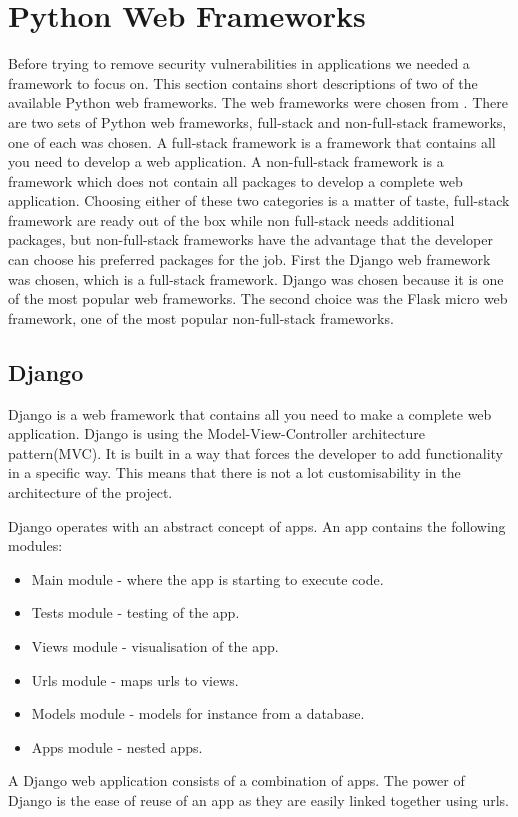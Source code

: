\section{Python Web Frameworks}\label{preliminaries:web_frameworks}
Before trying to remove security vulnerabilities in applications we needed a framework to focus on.
This section contains short descriptions of two of the available Python web frameworks.
The web frameworks were chosen from \citet{python_web_frameworks_list}.
There are two sets of Python web frameworks, full-stack and non-full-stack frameworks, one of each was chosen.
A full-stack framework is a framework that contains all you need to develop a web application.
A non-full-stack framework is a framework which does not contain all packages to develop a complete web application.
Choosing either of these two categories is a matter of taste, full-stack framework are ready out of the box while non full-stack needs additional packages, but non-full-stack frameworks have the advantage that the developer can choose his preferred packages for the job.
First the Django web framework was chosen, which is a full-stack framework.
Django was chosen because it is one of the most popular web frameworks.
The second choice was the Flask micro web framework, one of the most popular non-full-stack frameworks.

\subsection{Django}
Django\cite{django_cite} is a web framework that contains all you need to make a complete web application.
Django is using the Model-View-Controller architecture pattern(MVC)\cite{leff2001web}.
It is built in a way that forces the developer to add functionality in a specific way.
This means that there is not a lot customisability in the architecture of the project.

Django operates with an abstract concept of apps.
An app contains the following modules:
\begin{itemize}
\item Main module - where the app is starting to execute code.
\item Tests module - testing of the app.
\item Views module - visualisation of the app.
\item Urls module - maps urls to views.
\item Models module - models for instance from a database.
\item Apps module - nested apps.
\end{itemize}
A Django web application consists of a combination of apps.
The power of Django is the ease of reuse of an app as they are easily linked together using urls.

